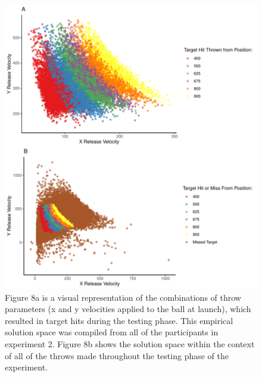 \documentclass[
  jou, donotrepeattitle,floatsintext]{apa7}
\begin{document}
\begin{figure}
\includegraphics[width=\textwidth]{IGAS_PJ_files/figure-latex/taskSpace-1} \caption{Figure 8a is a visual representation of the combinations of throw parameters (x and y velocities applied to the ball at launch), which resulted in target hits during the testing phase. This empirical solution space was compiled from all of the participants in experiment 2. Figure 8b shows the solution space within the context of all of the throws made throughout the testing phase of the experiment.}\label{fig:taskSpace}
\end{figure}
\end{document}
